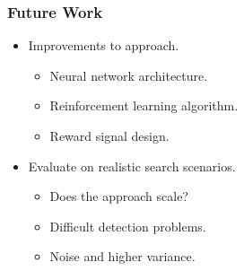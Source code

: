 \begin{frame}
    \frametitle{Future Work}

    \begin{itemize}
        \item Improvements to approach.
        \begin{itemize}
            \item Neural network architecture.
            \item Reinforcement learning algorithm.
            \item Reward signal design.
        \end{itemize}
        \item Evaluate on realistic search scenarios.
        \begin{itemize}
            \item Does the approach scale?
            \item Difficult detection problems.
            \item Noise and higher variance.
        \end{itemize}
    \end{itemize}
\end{frame}